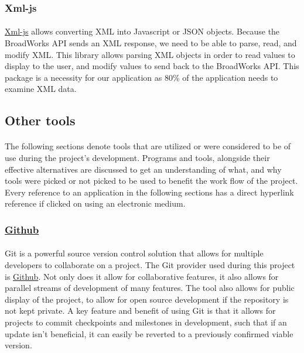 \documentclass[12pt]{article}
\begin{document}
\subsubsection{Xml-js}	
\paragraph{}
	\href{https://www.npmjs.com/package/xml-js}{Xml-js} allows converting XML into Javascript or JSON objects. Because the BroadWorks API sends an XML response, we need to be able to parse, read, and modify XML. This library allows parsing XML objects in order to read values to display to the user, and modify values to send back to the BroadWorks API. This package is a necessity for our application as 80\% of the application needs to examine XML data.
	
\subsection{Other tools}
\paragraph{}	The following sections denote tools that are utilized or were considered to be of use during the project's development. Programs and tools, alongside their effective alternatives are discussed to get an understanding of what, and why tools were picked or not picked to be used to benefit the work flow of the project. Every reference to an application in the following sections has a direct hyperlink reference if clicked on using an electronic medium.

\subsubsection{\href{https://Github.com}{Github}}
\paragraph{}	Git is a powerful source version control solution that allows for multiple developers to collaborate on  a project. The Git provider used during this project is \href{https://Github.com}{Github}. Not only does it allow for collaborative features, it also allows for parallel streams of development of many features. The tool also allows for public display of the project, to allow for open source development if the repository is not kept private. A key feature and benefit of using Git is that it allows for projects to commit checkpoints and milestones in development, such that if an update isn't beneficial, it can easily be reverted to a previously confirmed viable version.
\end{document}
